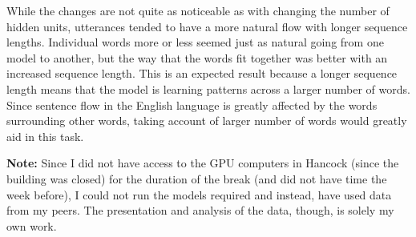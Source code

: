 \documentclass[a4paper]{article}
\begin{document}
While the changes are not quite as noticeable as with changing the 
number of hidden units, utterances tended to have a more natural flow
with longer sequence lengths. Individual words more or less seemed just
as natural going from one model to another, but the way that the words
fit together was better with an increased sequence length. 
This is an expected result because a longer sequence length means that
the model is learning patterns across a larger number of words.
Since sentence flow in the English language is greatly affected by
the words surrounding other words, taking account of larger number of
words would greatly aid in this task.



\vspace{10mm}
\noindent
\textbf{Note:} Since I did not have access to the GPU computers in Hancock (since the building was closed)
for the duration of the break (and did not have time the week before),
I could not run the models required and instead, have used data from
my peers.
The presentation and analysis of the data, though, is solely my own
work.
\end{document}
